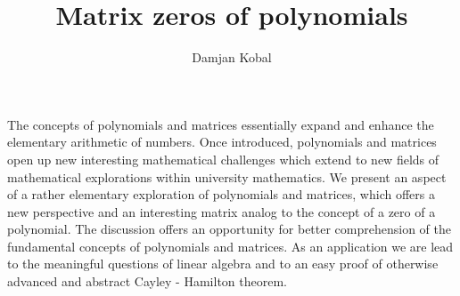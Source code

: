 \documentclass[a4paper]{amsart}
\date{}
\begin{document}
\title{Matrix zeros of polynomials}
\author{Damjan Kobal} %
\address{Department of Mathematics, Faculty of Mathematics and Physics, University of Ljubljana, Jadranska 19, 1000 Ljubljana, EU - Slovenia} %

\maketitle


The concepts of polynomials and matrices essentially expand and enhance the elementary arithmetic of numbers. Once introduced, polynomials and matrices open up new interesting mathematical challenges which extend to new fields of mathematical explorations within university mathematics. We present an aspect of a rather elementary exploration of polynomials and matrices, which offers a new perspective and an interesting matrix analog to the concept of a zero of a polynomial. The discussion offers an opportunity for better comprehension of the fundamental concepts of polynomials and matrices. As an application we are lead to the meaningful questions of linear algebra and to an easy proof of otherwise advanced and abstract Cayley - Hamilton theorem.
\end{document}
